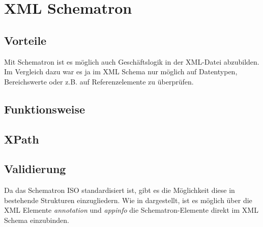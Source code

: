 \chapter{XML Schematron}
\label{cha:Schematron}

\section{Vorteile}
Mit Schematron ist es möglich auch Geschäftslogik in der XML-Datei abzubilden.
Im Vergleich dazu war es ja im XML Schema nur möglich auf Datentypen, Bereichswerte oder z.B. auf Referenzelemente zu überprüfen.

\section{Funktionsweise}

\section{XPath}


\section{Validierung}
Da das Schematron ISO standardisiert ist, gibt es die Möglichkeit diese in bestehende Strukturen einzugliedern. Wie in \cite{Akhilesh_validatinga} dargestellt, ist es möglich über die XML Elemente \emph{annotation} und \emph{appinfo} die Schematron-Elemente direkt im XML Schema einzubinden.
